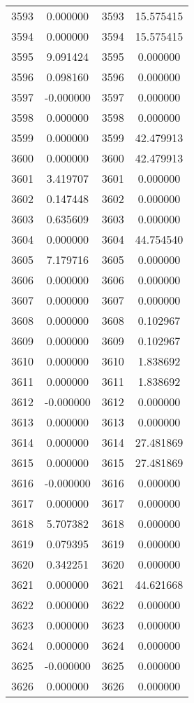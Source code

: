 \documentclass[12pt]{article}
\begin{document}
\begin{longtable}{@{}cccc@{}}
3593 & 0.000000 & 3593 & 15.575415 \\
3594 & 0.000000 & 3594 & 15.575415 \\
3595 & 9.091424 & 3595 & 0.000000 \\
3596 & 0.098160 & 3596 & 0.000000 \\
3597 & -0.000000 & 3597 & 0.000000 \\
3598 & 0.000000 & 3598 & 0.000000 \\
3599 & 0.000000 & 3599 & 42.479913 \\
3600 & 0.000000 & 3600 & 42.479913 \\
3601 & 3.419707 & 3601 & 0.000000 \\
3602 & 0.147448 & 3602 & 0.000000 \\
3603 & 0.635609 & 3603 & 0.000000 \\
3604 & 0.000000 & 3604 & 44.754540 \\
3605 & 7.179716 & 3605 & 0.000000 \\
3606 & 0.000000 & 3606 & 0.000000 \\
3607 & 0.000000 & 3607 & 0.000000 \\
3608 & 0.000000 & 3608 & 0.102967 \\
3609 & 0.000000 & 3609 & 0.102967 \\
3610 & 0.000000 & 3610 & 1.838692 \\
3611 & 0.000000 & 3611 & 1.838692 \\
3612 & -0.000000 & 3612 & 0.000000 \\
3613 & 0.000000 & 3613 & 0.000000 \\
3614 & 0.000000 & 3614 & 27.481869 \\
3615 & 0.000000 & 3615 & 27.481869 \\
3616 & -0.000000 & 3616 & 0.000000 \\
3617 & 0.000000 & 3617 & 0.000000 \\
3618 & 5.707382 & 3618 & 0.000000 \\
3619 & 0.079395 & 3619 & 0.000000 \\
3620 & 0.342251 & 3620 & 0.000000 \\
3621 & 0.000000 & 3621 & 44.621668 \\
3622 & 0.000000 & 3622 & 0.000000 \\
3623 & 0.000000 & 3623 & 0.000000 \\
3624 & 0.000000 & 3624 & 0.000000 \\
3625 & -0.000000 & 3625 & 0.000000 \\
3626 & 0.000000 & 3626 & 0.000000 \\

\end{longtable}
\end{document}

